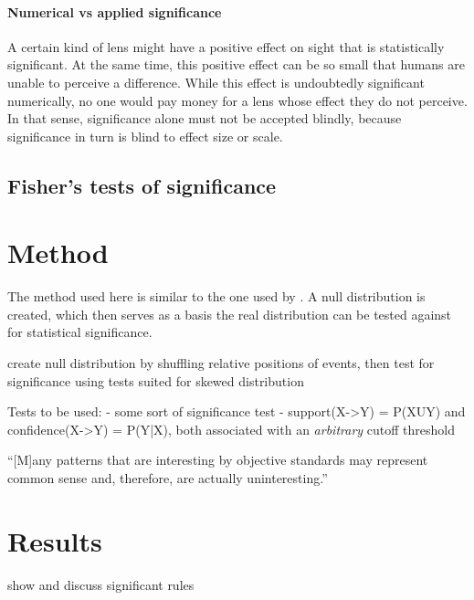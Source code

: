 \paragraph{Numerical vs applied significance} A certain kind of lens might have a positive effect on sight that is statistically significant. At the same time, this positive effect can be so small that humans are unable to perceive a difference. While this effect is undoubtedly significant numerically, no one would pay money for a lens whose effect they do not perceive. In that sense, significance alone must not be accepted blindly, because significance in turn is blind to effect size or scale.

\subsection{Fisher's tests of significance}



\section{Method}
\label{sec:significancemethod}
The method used here is similar to the one used by \citet[]{abuzhaya17}. A null distribution is created, which then serves as a basis the real distribution can be tested against for statistical significance.

create null distribution by shuffling relative positions of events, then test for significance using tests suited for skewed distribution

Tests to be used:
- some sort of significance test
- support(X->Y) = P(XUY) and confidence(X->Y) = P(Y|X), both associated with an \emph{arbitrary} cutoff threshold \citep[]{han12}

``[M]any patterns that are interesting by objective standards may represent common sense and, therefore, are actually uninteresting.'' \citep[]{han12}

\section{Results}
\label{sec:significanceresults}
show and discuss significant rules